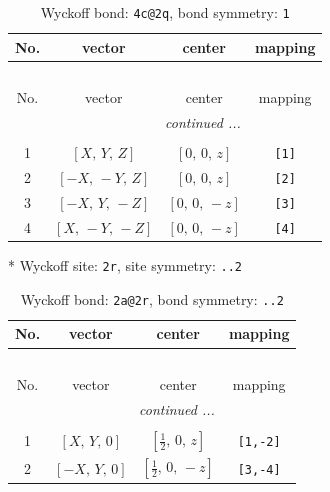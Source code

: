 \documentclass[fleqn,8pt]{jsarticle}
\begin{document}
\begin{longtable}{cccc}
\caption{Wyckoff bond: {\tt 4c@2q}, bond symmetry: {\tt 1}}
 \\
 \hline \hline
No. & vector & center & mapping \\ \hline \endfirsthead

\multicolumn{3}{l}{\tablename\ \thetable{}} \\
 \hline \hline
No. & vector & center & mapping \\ \hline \endhead

 \hline \hline
\multicolumn{3}{r}{\footnotesize\it continued ...} \\ \endfoot

 \hline \hline
\multicolumn{3}{r}{} \\ \endlastfoot

1 & $\left[ X,\, Y,\, Z \right]$ & $\left[ 0,\, 0,\, z \right]$ & {\tt [1]} \\ \hline
2 & $\left[ - X,\, - Y,\, Z \right]$ & $\left[ 0,\, 0,\, z \right]$ & {\tt [2]} \\ \hline
3 & $\left[ - X,\, Y,\, - Z \right]$ & $\left[ 0,\, 0,\, - z \right]$ & {\tt [3]} \\ \hline
4 & $\left[ X,\, - Y,\, - Z \right]$ & $\left[ 0,\, 0,\, - z \right]$ & {\tt [4]} \\
\end{longtable}
* Wyckoff site: {\tt 2r}, site symmetry: {\tt ..2}
\renewcommand{\arraystretch}{1.2}
\begin{longtable}{cccc}
\caption{Wyckoff bond: {\tt 2a@2r}, bond symmetry: {\tt ..2}}
 \\
 \hline \hline
No. & vector & center & mapping \\ \hline \endfirsthead

\multicolumn{3}{l}{\tablename\ \thetable{}} \\
 \hline \hline
No. & vector & center & mapping \\ \hline \endhead

 \hline \hline
\multicolumn{3}{r}{\footnotesize\it continued ...} \\ \endfoot

 \hline \hline
\multicolumn{3}{r}{} \\ \endlastfoot

1 & $\left[ X,\, Y,\, 0 \right]$ & $\left[ \frac{1}{2},\, 0,\, z \right]$ & {\tt [1,-2]} \\ \hline
2 & $\left[ - X,\, Y,\, 0 \right]$ & $\left[ \frac{1}{2},\, 0,\, - z \right]$ & {\tt [3,-4]} \\
\end{longtable}
\end{document}
